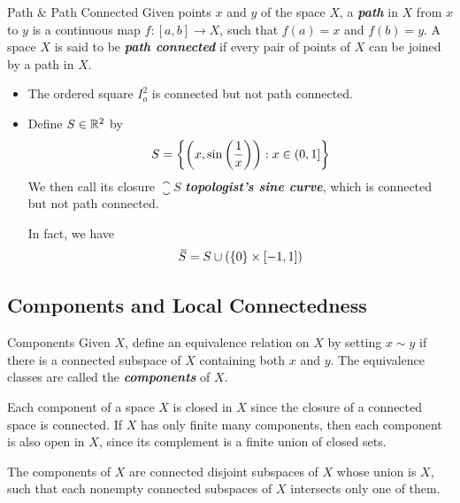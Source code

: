 \documentclass[12pt,a4paper]{article}
\begin{document}
    \begin{defi}{Path \& Path Connected}
        Given points $x$ and $y$ of the space $X$, a \textbf{\textit{path}} in $X$ from $x$ to $y$ is a continuous map $f:[a,b]\to X$, such that $f(a)=x$ and $f(b)=y$. A space $X$ is said to be \textit{\textbf{path connected}} if every pair of points of $X$ can be joined by a path in $X$.
    \end{defi}
    \hfill

    \begin{eg}\hfill{}
    
        \begin{itemize}
            \item The ordered square $I^2_o$ is connected but not path connected.
            \item Define $S\in\mathbb{R}^2$ by
            $$
            S=\left\{\left(x, \sin\left(\frac{1}{x}\right)\right):x\in(0,1]\right\}
            $$
            We then call its closure $\closure{S}$ \textbf{\textit{topologist's sine curve}}, which is connected but not path connected.
            \begin{remark}
                In fact, we have
                $$
                {}\mkern3mu\overline{\mkern-3muS}=S\cup(\left\{0\right\}\times[-1,1])
                $$
            \end{remark}
        \end{itemize}
    \end{eg}
    \hfill

    \subsection{Components and Local Connectedness}
    \begin{defi}{Components}
        Given $X$, define an equivalence relation on $X$ by setting $x\sim y$ if there is a connected subspace of $X$ containing both $x$ and $y$. The equivalence classes are called the \textbf{\textit{components}} of $X$.
    \end{defi}
    \begin{remark}
        Each component of a space $X$ is closed in $X$ since the closure of a connected space is connected. If $X$ has only finite many components, then each component is also open in $X$, since its complement is a finite union of closed sets.
    \end{remark}
    \hfill

    \begin{thm}
        The components of $X$ are connected disjoint subspaces of $X$ whose union is $X$, such that each nonempty connected subspaces of $X$ intersects only one of them.   
    \end{thm}
    \hfill
\end{document}
